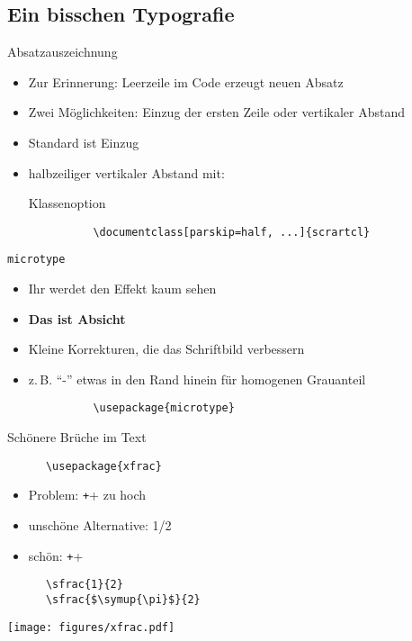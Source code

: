 \subsection{Ein bisschen Typografie}
\begin{frame}[fragile]{Absatzauszeichnung}
  \begin{itemize}
    \item Zur Erinnerung: Leerzeile im Code erzeugt neuen Absatz
    \item Zwei Möglichkeiten: Einzug der ersten Zeile oder vertikaler Abstand
    \item Standard ist Einzug
    \item halbzeiliger vertikaler Abstand mit:
      \begin{block}{Klassenoption}
        \begin{verbatim}
          \documentclass[parskip=half, ...]{scrartcl}
        \end{verbatim}
      \end{block}
  \end{itemize}
\end{frame}

\begin{frame}[fragile]{\texttt{microtype}}
  \begin{itemize}
    \item Ihr werdet den Effekt kaum sehen
    \item \textbf{Das ist Absicht}
    \item Kleine Korrekturen, die das Schriftbild verbessern
    \item z.\,B. \enquote{-} etwas in den Rand hinein für homogenen Grauanteil
      \begin{Packages}
        \begin{verbatim}
          \usepackage{microtype}
        \end{verbatim}
      \end{Packages}
  \end{itemize}
\end{frame}

\begin{frame}[fragile]{Schönere Brüche im Text}
  \begin{Packages}
    \begin{verbatim}
      \usepackage{xfrac}
    \end{verbatim}
  \end{Packages}
  \begin{itemize}
    \item Problem: \texttt++ zu hoch
    \item unschöne Alternative: 1/2
    \item schön: \texttt++
  \end{itemize}
  \begin{CodeExample}{0.5}
    \begin{verbatim}
      \sfrac{1}{2}
      \sfrac{$\symup{\pi}$}{2}
    \end{verbatim}
  \CodeResult
    \texttt{[image: figures/xfrac.pdf]}
  \end{CodeExample}
\end{frame}

